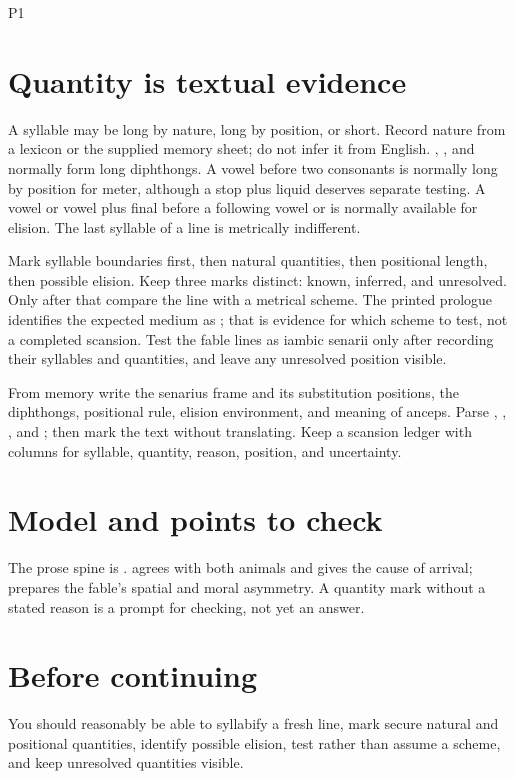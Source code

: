 \begin{courseunit}{P1}
\section{Quantity is textual evidence}

A syllable may be long by nature, long by position, or short. Record nature
from a lexicon or the supplied memory sheet; do not infer it from English.
, , and  normally form long diphthongs. A vowel
before two consonants is normally long by position for meter, although a stop
plus liquid deserves separate testing. A vowel or vowel plus final
 before a following vowel or  is normally available for
elision. The last syllable of a line is metrically indifferent.

Mark syllable boundaries first, then natural quantities, then positional
length, then possible elision. Keep three marks distinct: known, inferred,
and unresolved. Only after that compare the line with a metrical scheme.
The printed prologue identifies the expected medium as ; that is evidence for which scheme to test, not a completed
scansion. Test the fable lines as iambic senarii only after recording their
syllables and quantities, and leave any unresolved position visible.

From memory write the senarius frame and its substitution positions, the
diphthongs, positional rule, elision environment, and meaning of anceps. Parse
, , , and ; then
mark the text without translating. Keep a scansion ledger with columns for
syllable, quantity, reason, position, and uncertainty.

\ifsolutions
\section{Model and points to check}
The prose spine is .
 agrees with both animals and gives the cause of arrival;
 prepares the fable's spatial and moral asymmetry. A quantity
mark without a stated reason is a prompt for checking, not yet an answer.
\else
\section{Before continuing}
You should reasonably be able to syllabify a fresh line, mark secure natural
and positional quantities, identify possible elision, test rather than assume
a scheme, and keep unresolved quantities visible.
\fi
\end{courseunit}

